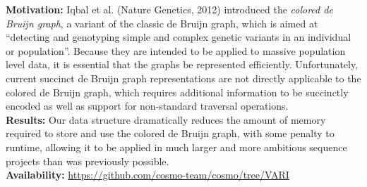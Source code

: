




  \textbf{Motivation:}
  Iqbal et al. (Nature Genetics, 2012) introduced the {\em colored de Bruijn graph}, a variant of the classic de Bruijn graph, which is aimed at ``detecting and genotyping simple and complex genetic variants in an individual or population''.
Because they are intended to be applied to massive population level data, it is essential that the graphs be represented efficiently.
Unfortunately, current succinct de Bruijn graph representations are not directly applicable to the colored de Bruijn graph, which requires additional information to be succinctly encoded as well as support for non-standard traversal operations.\\
\textbf{Results:}
Our data structure dramatically reduces the amount of memory required to store and use the colored de Bruijn graph, with some penalty to runtime, allowing it to be applied in much larger and more ambitious sequence projects than was previously possible.\\
\textbf{Availability:} \url{https://github.com/cosmo-team/cosmo/tree/VARI}
